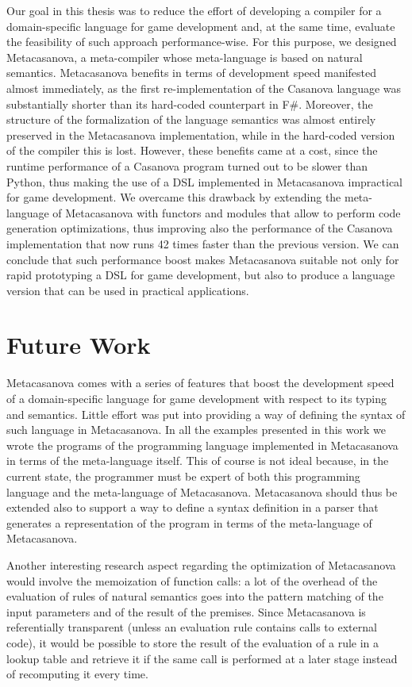 Our goal in this thesis was to reduce the effort of developing a compiler for a domain-specific language for game development and, at the same time, evaluate the feasibility of such approach performance-wise. For this purpose, we designed Metacasanova, a meta-compiler whose meta-language is based on natural semantics. Metacasanova benefits in terms of development speed manifested almost immediately, as the first re-implementation of the Casanova language was substantially shorter than its hard-coded counterpart in F\#. Moreover, the structure of the formalization of the language semantics was almost entirely preserved in the Metacasanova implementation, while in the hard-coded version of the compiler this is lost. However, these benefits came at a cost, since the runtime performance of a Casanova program turned out to be slower than Python, thus making the use of a DSL implemented in Metacasanova impractical for game development. We overcame this drawback by extending the meta-language of Metacasanova with functors and modules that allow to perform code generation optimizations, thus improving also the performance of the Casanova implementation that now runs 42 times faster than the previous version. We can conclude that such performance boost makes Metacasanova suitable not only for rapid prototyping a DSL for game development, but also to produce a language version that can be used in practical applications.

\section{Future Work}
\label{sec:ch_conclusion_future_work}
Metacasanova comes with a series of features that boost the development speed of a domain-specific language for game development with respect to its typing and semantics. Little effort was put into providing a way of defining the syntax of such language in Metacasanova. In all the examples presented in this work we wrote the programs of the programming language implemented in Metacasanova in terms of the meta-language itself. This of course is not ideal because, in the current state, the programmer must be expert of both this programming language and the meta-language of Metacasanova. Metacasanova should thus be extended also to support a way to define a syntax definition in a parser that generates a representation of the program in terms of the meta-language of Metacasanova.

Another interesting research aspect regarding the optimization of Metacasanova would involve the memoization of function calls: a lot of the overhead of the evaluation of rules of natural semantics goes into the pattern matching of the input parameters and of the result of the premises. Since Metacasanova is referentially transparent (unless an evaluation rule contains calls to external code), it would be possible to store the result of the evaluation of a rule in a lookup table and retrieve it if the same call is performed at a later stage instead of recomputing it every time.

